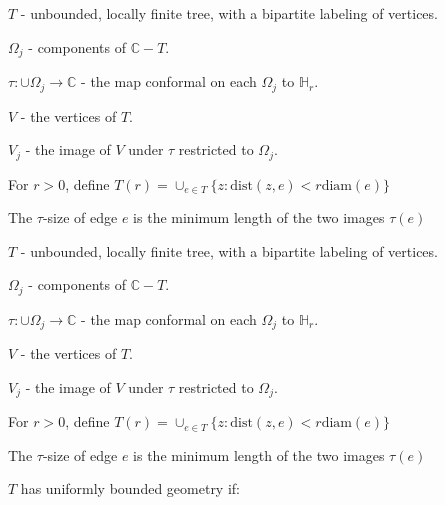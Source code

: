 \documentclass{beamer}
\begin{document}
\begin{frame}

$T$ - unbounded, locally finite tree, with a bipartite labeling of vertices.

$\Omega_j$ - components of $\mathbb{C}-T$.

$\tau: \cup \Omega_j \rightarrow \mathbb{C}$ - the map conformal on each $\Omega_j$ to $\mathbb{H}_r$.

$V$ - the vertices of $T$. 

$V_j$ - the image of $V$ under $\tau$ restricted to $\Omega_j$.

For $r > 0$, define $T(r) = \cup_{e\in T} \{z : \textrm{dist}(z,e) < r\textrm{diam}(e) \}$

The {\color{red} $\tau$-size} of edge $e$ is the minimum length of the two images $\tau(e)$

\end{frame}




\begin{frame}

$T$ - unbounded, locally finite tree, with a bipartite labeling of vertices.

$\Omega_j$ - components of $\mathbb{C}-T$.

$\tau: \cup \Omega_j \rightarrow \mathbb{C}$ - the map conformal on each $\Omega_j$ to $\mathbb{H}_r$.

$V$ - the vertices of $T$. 

$V_j$ - the image of $V$ under $\tau$ restricted to $\Omega_j$.

For $r > 0$, define $T(r) = \cup_{e\in T} \{z : \textrm{dist}(z,e) < r\textrm{diam}(e) \}$

The $\tau$-size of edge $e$ is the minimum length of the two images $\tau(e)$

\vspace{5mm}

$T$ has uniformly bounded geometry if: 


\end{frame}
\end{document}
